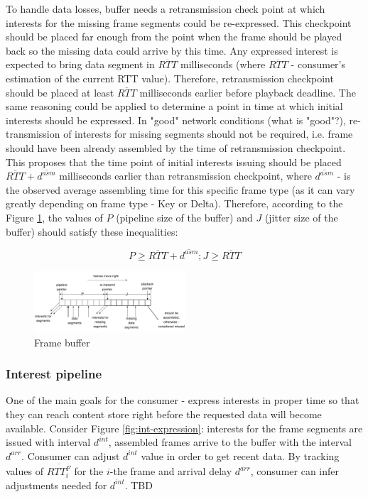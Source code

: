 \documentclass[10pt]{proc}
\begin{document}
To handle data losses, buffer needs a retransmission check point at which interests for the missing frame segments could be re-expressed. This checkpoint should be placed far enough from the point when the frame should be played back so the missing data could arrive by this time. Any expressed interest is expected to bring data segment in $\overline{RTT}$ milliseconds (where $\overline{RTT}$ - consumer's estimation of the current RTT value). Therefore, retransmission checkpoint should be placed at least $\overline{RTT}$ milliseconds earlier before playback deadline. The same reasoning could be applied to determine a point in time at which initial interests should be expressed. In "good" network conditions (what is "good"?), re-transmission of interests for missing segments should not be required, i.e.  frame should have been already assembled by the time of retransmission checkpoint. This proposes that the time point of initial interests issuing should be placed $\overline{RTT}+\overline{d^{asm}}$ milliseconds earlier than retransmission checkpoint, where $\overline{d^{asm}}$ - is the observed average assembling time for this specific frame type (as it can vary greatly depending on frame type - Key or Delta). Therefore, according to the Figure \ref{fig:buffer}, the values of $P$ (pipeline size of the buffer) and $J$ (jitter size of the buffer) should satisfy these inequalities:

\begin{equation}
P \geq \overline{RTT} + \overline{d^{asm}}; J \geq \overline{RTT}
\end{equation}


\begin{figure}[Ht!]
\centering
\includegraphics[width=0.5\textwidth]{buffer}
\caption{Frame buffer}
\label{fig:buffer}
\end{figure} 

\subsubsection{Interest pipeline}
One of the main goals for the consumer - express interests in proper time so that they can reach content store right before the requested data will become available. 
Consider Figure \ref{fig:int-expression}: interests for the frame segments are issued with interval $d^{int}$, assembled frames arrive to the buffer with the interval $d^{arr}$. Consumer can adjust $d^{int}$ value in order to get recent data. By tracking values of $\overline{RTT^{F}_i}$ for the $i$-the frame and arrival delay $d^{arr}$, consumer can infer adjustments needed for $d^{int}$. 
TBD
\end{document}
